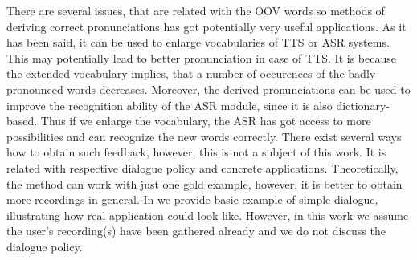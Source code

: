 There are several issues, that are related with the OOV words so methods of deriving correct pronunciations has got potentially very useful applications.
As it has been said, it can be used to enlarge vocabularies of TTS or ASR systems.
This may potentially lead to better pronunciation in case of TTS.
It is because the extended vocabulary implies, that a number of occurences of the badly pronounced words decreases.
Moreover, the derived pronunciations can be used to improve the recognition ability of the ASR module, since it is also dictionary-based.
Thus if we enlarge the vocabulary, the ASR has got access to more possibilities and can recognize the new words correctly.
There exist several ways how to obtain such feedback, however, this is not a subject of this work.
It is related with respective dialogue policy and concrete applications.
Theoretically, the method can work with just one gold example, however, it is better to obtain more recordings in general.
In  we provide basic example of simple dialogue, illustrating how real application could look like.
However, in this work we assume the user's recording(s) have been gathered already and we do not discuss the dialogue policy.
